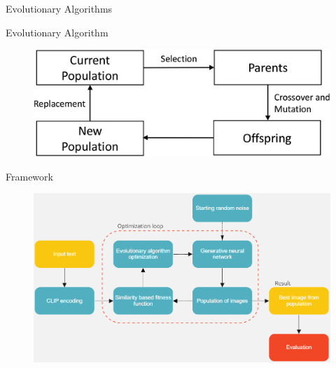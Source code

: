 \documentclass[t]{beamer}
\begin{document}
\begin{frame}[c]{Evolutionary Algorithms}
\begin{block}{Evolutionary Algorithm}
\begin{figure}[ht!]
    \centering
    \includegraphics[scale=0.9]{gen-algo.jpg}
\end{figure} 
\end{block}
\end{frame}

\begin{frame}[c]{Framework}
\begin{figure}[ht!]
    \centering
    \includegraphics[scale=0.3]{flow.png}
\end{figure} 
\end{frame}
\end{document}
